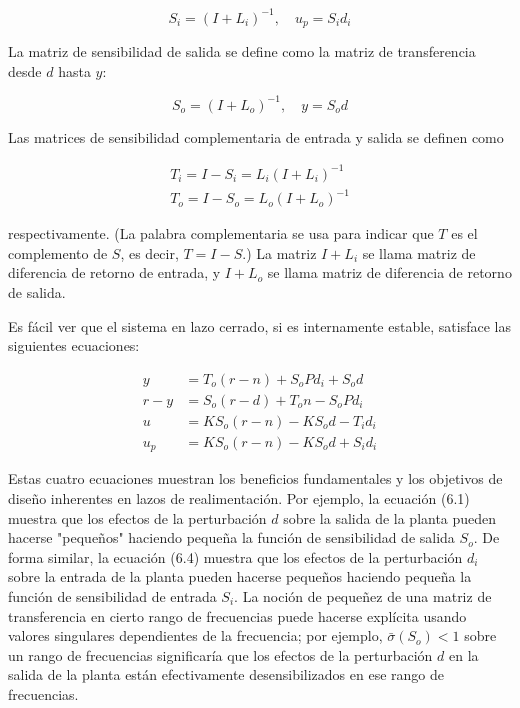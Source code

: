 $$
S_{i}=\left(I+L_{i}\right)^{-1}, \quad u_{p}=S_{i} d_{i}
$$

La matriz de sensibilidad de salida se define como la matriz de transferencia desde $d$ hasta $y$:

$$
S_{o}=\left(I+L_{o}\right)^{-1}, \quad y=S_{o} d
$$

Las matrices de sensibilidad complementaria de entrada y salida se definen como

$$
\begin{gathered}
T_{i}=I-S_{i}=L_{i}\left(I+L_{i}\right)^{-1} \\
T_{o}=I-S_{o}=L_{o}\left(I+L_{o}\right)^{-1}
\end{gathered}
$$

respectivamente. (La palabra complementaria se usa para indicar que $T$ es el complemento de $S$, es decir, $T=I-S$.) La matriz $I+L_{i}$ se llama matriz de diferencia de retorno de entrada, y $I+L_{o}$ se llama matriz de diferencia de retorno de salida.

Es fácil ver que el sistema en lazo cerrado, si es internamente estable, satisface las siguientes ecuaciones:


\begin{align*}
y & =T_{o}(r-n)+S_{o} P d_{i}+S_{o} d  \tag{6.1}\\
r-y & =S_{o}(r-d)+T_{o} n-S_{o} P d_{i}  \tag{6.2}\\
u & =K S_{o}(r-n)-K S_{o} d-T_{i} d_{i}  \tag{6.3}\\
u_{p} & =K S_{o}(r-n)-K S_{o} d+S_{i} d_{i} \tag{6.4}
\end{align*}


Estas cuatro ecuaciones muestran los beneficios fundamentales y los objetivos de diseño inherentes en lazos de realimentación. Por ejemplo, la ecuación (6.1) muestra que los efectos de la perturbación $d$ sobre la salida de la planta pueden hacerse "pequeños" haciendo pequeña la función de sensibilidad de salida $S_{o}$. De forma similar, la ecuación (6.4) muestra que los efectos de la perturbación $d_{i}$ sobre la entrada de la planta pueden hacerse pequeños haciendo pequeña la función de sensibilidad de entrada $S_{i}$. La noción de pequeñez de una matriz de transferencia en cierto rango de frecuencias puede hacerse explícita usando valores singulares dependientes de la frecuencia; por ejemplo, $\bar{\sigma}\left(S_{o}\right)<1$ sobre un rango de frecuencias significaría que los efectos de la perturbación $d$ en la salida de la planta están efectivamente desensibilizados en ese rango de frecuencias.

